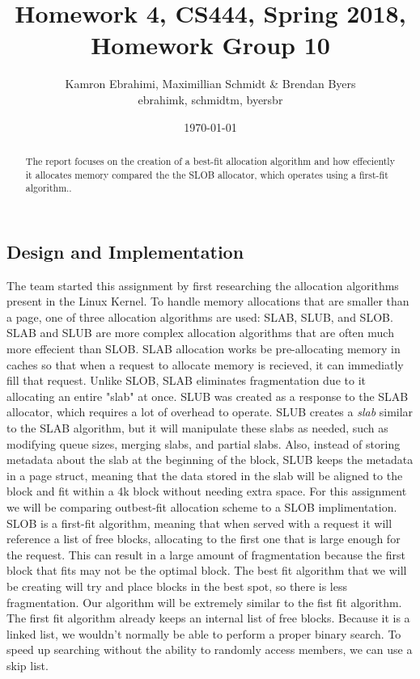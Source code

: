 \documentclass[10pt,onecolumn,draftclsnofoot]{IEEEtran} %
\title{ Homework 4, CS444, Spring 2018, Homework Group 10}
\author{Kamron Ebrahimi, Maximillian Schmidt \& Brendan Byers \\ ebrahimk, schmidtm, byersbr }
\date{\today}
\begin{document}
\begin{titlingpage}
\maketitle
\begin{abstract}
\begin{singlespace}
The report focuses on the creation of a best-fit allocation algorithm and how effeciently it allocates memory compared the the SLOB allocator, which operates using a first-fit algorithm.. 
\end{singlespace}
\end{abstract}
\end{titlingpage}


\tableofcontents

\newpage
\begin{singlespace}
\section{\bf  Design and Implementation}

  \normalfont \indent The team started this assignment by first researching the allocation algorithms present in the Linux Kernel. To handle memory allocations that are smaller than a page, one of three allocation algorithms are used: SLAB, SLUB, and SLOB.  SLAB and SLUB are more complex allocation algorithms that are often much more effecient than SLOB.  SLAB allocation works be pre-allocating memory in caches so that when a request to allocate memory is recieved, it can immediatly fill that request.  Unlike SLOB, SLAB eliminates fragmentation due to it allocating an entire "slab" at once.  SLUB was created as a response to the SLAB allocator, which requires a lot of overhead to operate.  SLUB creates a \textit{slab} similar to the SLAB algorithm, but it will manipulate these slabs as needed, such as modifying queue sizes, merging slabs, and partial slabs.  Also, instead of storing metadata about the slab at the beginning of the block, SLUB keeps the metadata in a page struct, meaning that the data stored in the slab will be aligned to the block and fit within a 4k block without needing extra space. 
  \normalfont \indent For this assignment we will be comparing outbest-fit allocation scheme to a SLOB implimentation.  SLOB is a first-fit algorithm, meaning that when served with a request it will reference a list of free blocks, allocating to the first one that is large enough for the request.  This can result in a large amount of fragmentation because the first block that fits may not be the optimal block. The best fit algorithm that we will be creating will try and place blocks in the best spot, so there is less fragmentation.
  \normalfont \indent Our algorithm will be extremely similar to the fist fit algorithm.  The first fit algorithm already keeps an internal list of free blocks.  Because it is a linked list, we wouldn't normally be able to perform a proper binary search.  To speed up searching without the ability to randomly access members, we can use a skip list.  


\end{singlespace}
\end{document}
